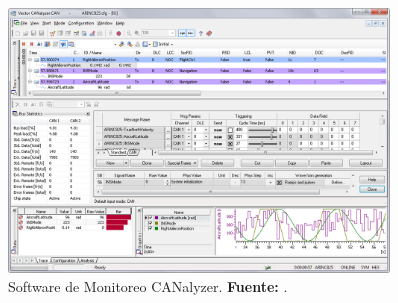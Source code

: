 \begin{figure}[H]
	\centering
	\includegraphics[width=0.9\textwidth]{./Cap3imagen/CANalyzer.png}
	\caption[Software de Monitoreo CANalyzer .]{Software de Monitoreo CANalyzer.\textbf{ Fuente:} \cite{cite_CANalyzer_c3}.}
	\label{fig_analyzer_c3} %
\end{figure}









